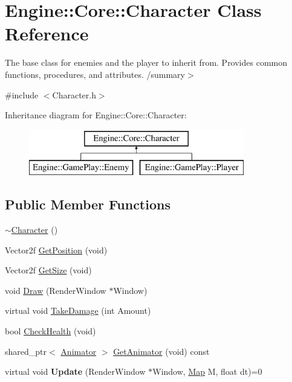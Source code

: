 \hypertarget{class_engine_1_1_core_1_1_character}{}\section{Engine\+:\+:Core\+:\+:Character Class Reference}
\label{class_engine_1_1_core_1_1_character}


The base class for enemies and the player to inherit from. Provides common functions, procedures, and attributes. /summary$>$  




{\ttfamily \#include $<$Character.\+h$>$}

Inheritance diagram for Engine\+:\+:Core\+:\+:Character\+:\begin{figure}[H]
\begin{center}
\leavevmode
\includegraphics[height=2.000000cm]{class_engine_1_1_core_1_1_character}
\end{center}
\end{figure}
\subsection*{Public Member Functions}
\begin{DoxyCompactItemize}
\item 
\hyperlink{class_engine_1_1_core_1_1_character_a0377de26714b79374d0591ca44c77fd1}{$\sim$\+Character} ()
\item 
Vector2f \hyperlink{class_engine_1_1_core_1_1_character_aea290308ddc56ab784c87f85e6b7f254}{Get\+Position} (void)
\item 
Vector2f \hyperlink{class_engine_1_1_core_1_1_character_a3465481aed27d24909b8e40577f09b10}{Get\+Size} (void)
\item 
void \hyperlink{class_engine_1_1_core_1_1_character_ae25a76e7497eeb6dbd1ad3b72c1ff721}{Draw} (Render\+Window $\ast$Window)
\item 
virtual void \hyperlink{class_engine_1_1_core_1_1_character_a2156c371584ca6a8d2961154f1b49c09}{Take\+Damage} (int Amount)
\item 
bool \hyperlink{class_engine_1_1_core_1_1_character_ad32924505f5bc7761590ecbfd06e6f09}{Check\+Health} (void)
\item 
shared\+\_\+ptr$<$ \hyperlink{class_engine_1_1_core_1_1_animator}{Animator} $>$ \hyperlink{class_engine_1_1_core_1_1_character_abcc0ba87be08fa12740a260cdd2d9adc}{Get\+Animator} (void) const
\item 
\mbox{\label{class_engine_1_1_core_1_1_character_a45c8ef2c736469a3264ee8733305675c}} 
virtual void {\bfseries Update} (Render\+Window $\ast$Window, \hyperlink{class_engine_1_1_core_1_1_map}{Map} M, float dt)=0
\end{DoxyCompactItemize}
